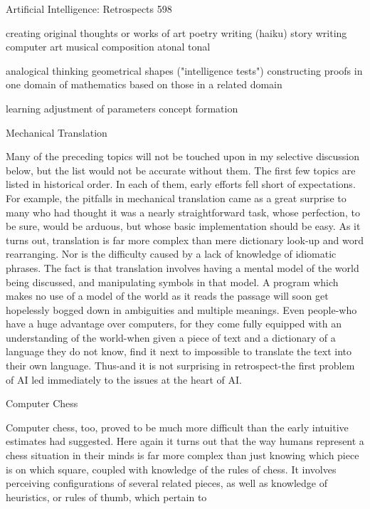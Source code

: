 {Artificial Intelligence: Retrospects                                              598

   creating original thoughts or works of art
        poetry writing (haiku) story writing
        computer art
        musical composition
               atonal
               tonal

   analogical thinking
       geometrical shapes ("intelligence tests")
       constructing proofs in one domain of mathematics based on
               those in a related domain

   learning
        adjustment of parameters
        concept formation

                                 Mechanical Translation

   Many of the preceding topics will not be touched upon in my selective discussion
   below, but the list would not be accurate without them. The first few topics are
   listed in historical order. In each of them, early efforts fell short of expectations.
   For example, the pitfalls in mechanical translation came as a great surprise to many
   who had thought it was a nearly straightforward task, whose perfection, to be sure,
   would be arduous, but whose basic implementation should be easy. As it turns out,
   translation is far more complex than mere dictionary look-up and word rearranging.
   Nor is the difficulty caused by a lack of knowledge of idiomatic phrases. The fact is
   that translation involves having a mental model of the world being discussed, and
   manipulating symbols in that model. A program which makes no use of a model of
   the world as it reads the passage will soon get hopelessly bogged down in
   ambiguities and multiple meanings. Even people-who have a huge advantage over
   computers, for they come fully equipped with an understanding of the world-when
   given a piece of text and a dictionary of a language they do not know, find it next to
   impossible to translate the text into their own language. Thus-and it is not
   surprising in retrospect-the first problem of AI led immediately to the issues at the
   heart of AI.

                                       Computer Chess

   Computer chess, too, proved to be much more difficult than the early intuitive
   estimates had suggested. Here again it turns out that the way humans represent a
   chess situation in their minds is far more complex than just knowing which piece is
   on which square, coupled with knowledge of the rules of chess. It involves
   perceiving configurations of several related pieces, as well as knowledge of
   heuristics, or rules of thumb, which pertain to



}
